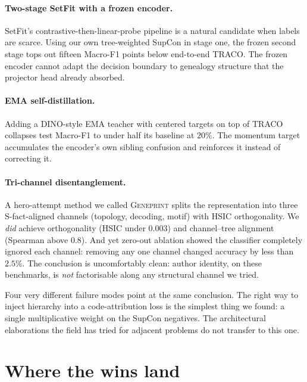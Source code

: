 ﻿\documentclass[11pt]{article}
\newcommand{\method}{\textsc{TRACO}\xspace}
\begin{document}
\paragraph{Two-stage SetFit with a frozen encoder.}
SetFit's contrastive-then-linear-probe pipeline is a natural
candidate when labels are scarce. Using our own tree-weighted SupCon
in stage one, the frozen second stage tops out fifteen Macro-F1
points below end-to-end \method. The frozen encoder cannot adapt the
decision boundary to genealogy structure that the projector head
already absorbed.

\paragraph{EMA self-distillation.} Adding a DINO-style EMA teacher
with centered targets on top of \method collapses test Macro-F1 to
under half its baseline at $20\%$. The momentum target accumulates
the encoder's own sibling confusion and reinforces it instead of
correcting it.

\paragraph{Tri-channel disentanglement.} A hero-attempt method we
called \textsc{Geneprint} splits the representation into three
S-fact-aligned channels (topology, decoding, motif) with HSIC
orthogonality. We \emph{did} achieve orthogonality (HSIC under
$0.003$) and channel--tree alignment (Spearman above $0.8$). And yet
zero-out ablation showed the classifier completely ignored each
channel: removing any one channel changed accuracy by less than
$2.5\%$. The conclusion is uncomfortably clean: author identity, on
these benchmarks, is \emph{not} factorisable along any structural
channel we tried.

Four very different failure modes point at the same conclusion. The
right way to inject hierarchy into a code-attribution loss is the
simplest thing we found: a single multiplicative weight on the
SupCon negatives. The architectural elaborations the field has
tried for adjacent problems do not transfer to this one.

\section{Where the wins land}
\label{sec:perfamily}
\end{document}
